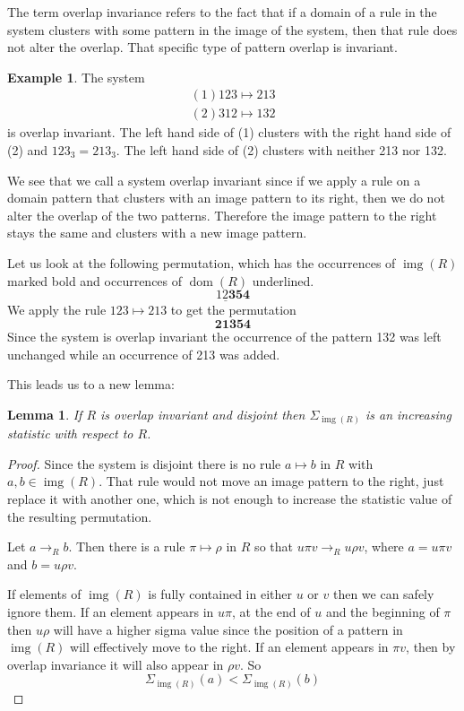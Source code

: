 \documentclass[a4paper, 11pt, english]{article}
\newcommand{\patternrule}{ \mapsto \!}
\newtheorem{lemma}[theorem]{Lemma}
\theoremstyle{definition}
\newtheorem{example}[theorem]{Example}
\DeclareMathOperator{\dom}{dom}
\DeclareMathOperator{\img}{img}
\begin{document}
The term overlap invariance refers to the fact that if a domain of a rule in the system clusters
with some pattern in the image of the system, then that rule does not alter the overlap. That
specific type of pattern overlap is invariant.

\begin{example}
  The system
  \begin{align*}
    (1) 123 \patternrule 213 \\
    (2) 312 \patternrule 132
  \end{align*}
  is overlap invariant. The left hand side of (1) clusters with the right hand side of (2) and 
  $123_3 = 213_3$. The left hand side of (2) clusters with neither 213 nor 132.

  We see that we call a system overlap invariant since if we apply a rule on a domain pattern that clusters
  with an image pattern to its right, then we do not alter the overlap of the two patterns.
  Therefore the image pattern to the right stays the same and clusters with a new image pattern.
  
  Let us look at the following permutation, which has the occurrences of $\img(R)$ marked bold and
  occurrences of $\dom(R)$ underlined.
  \[
    \underline{12\bm{3}}\bm{54}
  \]
  We apply the rule $123 \patternrule 213$ to get the permutation
  \[
    \bm{21\bm{3}}\bm{54}
  \]
  Since the system is overlap invariant the occurrence of the pattern 132 was left unchanged while
  an occurrence of 213 was added.
\end{example}

This leads us to a new lemma:

\begin{lemma}
  If $R$ is overlap invariant and disjoint then $\Sigma_{\img(R)}$ is an increasing statistic with respect to $R$. 
\end{lemma}
\begin{proof}
  Since the system is disjoint there is no rule $a \patternrule b$ in $R$ with $a, b \in \img(R)$.
  That rule would not move an image pattern to the right, just replace it with another one, which is
  not enough to increase the statistic value of the resulting permutation.

    Let $a \to_R b$. Then there is a rule $\pi \patternrule \rho$ in
    $R$ so that $u \pi v \to_R u \rho v$, where $a = u \pi v$ and $b =
    u \rho v$. 

    If elements of $\img(R)$ is fully contained in either $u$ or $v$ then we
    can safely ignore them. If an element appears in $u\pi$, at the end of $u$ and the beginning of
    $\pi$ then $u \rho$ will have a higher sigma value since the position of a pattern in $\img(R)$ will
    effectively move to the right. If an element appears in $\pi v$,
    then by overlap invariance it will also appear in $\rho v$.
    So
    \[
        \Sigma_{\img(R)}(a) < \Sigma_{\img(R)}(b)
    \]

\end{proof}
\end{document}
